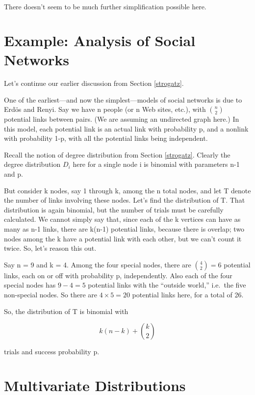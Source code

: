 There doesn't seem to be much further simplification possible here.

\section{Example:  Analysis of Social Networks}
\label{socnets}

Let's continue our earlier discussion from Section \ref{strogatz}.

One of the earliest---and now the simplest---models of social networks
is due to Erd\"{o}s and Renyi.  Say we have n people (or n Web sites,
etc.), with $\binom{n}{2}$ potential links between pairs.  (We are
assuming an undirected graph here.)  In this model, each potential link
is an actual link with probability p, and a nonlink with probability
1-p, with all the potential links being independent.

Recall the notion of degree distribution from Section \ref{strogatz}.
Clearly the degree distribution $D_i$ here for a single node i is
binomial with parameters n-1 and p.  

But consider k nodes, say 1 through k, among the n total nodes, and let
T denote the number of links involving these nodes.  Let's find the
distribution of T.  That distribution is again binomial, but the number
of trials must be carefully calculated.  We cannot simply say that,
since each of the k vertices can have as many as n-1 links, there are
k(n-1) potential links, because there is overlap; two nodes among the k
have a potential link with each other, but we can't count it twice.  So,
let's reason this out.

Say n = 9 and k = 4.  Among the four special nodes, there are $\binom{4}{2}
= 6$ potential links, each on or off with probability p, independently.
Also each of the four special nodes has $9 - 4 = 5$ potential links with
the ``outside world,'' i.e.\ the five non-special nodes.  So there are
$4 \times 5 = 20$ potential links here, for a total of 26.

So, the distribution of T is binomial with

\begin{equation}
\label{knk2}
k (n-k) + \binom{k}{2}
\end{equation}

trials and success probability p.

\section{Multivariate Distributions}
\label{minimul}

